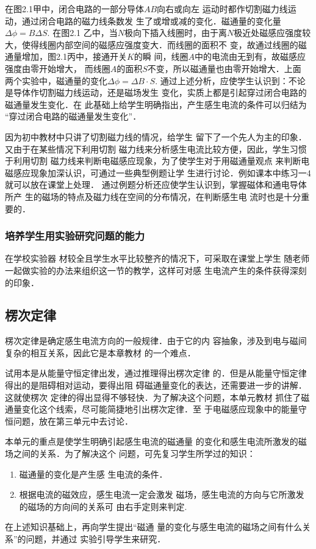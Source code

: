 在图2.1甲中，闭合电路的一部分导体$AB$向右或向左
运动时都作切割磁力线运动，通过闭合电路的磁力线条数发
生了或增或减的变化．磁通量的变化量$\Delta\phi=B\Delta S$. 在图2.1
乙中，当$N$极向下插入线圈时，由于离$N$极近处磁感应强度较
大，使得线圈内部空间的磁感应强度变大．而线圈的面积不
变，故通过线圈的磁通量增加，图2.1丙中，接通开关$K$的瞬
间，线圈$A$中的电流由无到有，故磁感应强度由零开始增大，
而线圈$A$的面积$S$不变，所以磁通量也由零开始增大．上面
两个实验中，磁通量的变化$\Delta\phi=\Delta B\cdot S$. 通过上述分析，应使学生认识到：不论是导体作切割磁力线运动，还是磁场发生
变化，实质上都是引起穿过闭合电路的磁通量发生变化．在
此基础上给学生明确指出，产生感生电流的条件可以归结为
“穿过闭合电路的磁通量发生变化”．

因为初中教材中只讲了切割磁力线的情况，给学生
留下了一个先人为主的印象．又由于在某些情况下利用切割
磁力线来分析感生电流比较方便，因此，学生习惯于利用切割
磁力线来判断电磁感应现象，为了使学生对于用磁通量观点
来判断电磁感应现象加深认识，可通过一些典型例题让学
生进行讨论．例如课本中练习一4就可以放在课堂上处理．
通过例题分析还应使学生认识到，掌握磁体和通电导体所产
生的磁场的特点及磁力线在空间的分布情况，在判断感生电
流时也是十分重要的．


\subsubsection{培养学生用实验研究问题的能力}

在学校实验器
材较全且学生水平比较整齐的情况下，可采取在课堂上学生
随老师一起做实验的办法来组织这一节的教学，这样可对感
生电流产生的条件获得深刻的印象．

\subsection{楞次定律}
楞次定律是确定感生电流方向的一般规律．由于它的内
容抽象，涉及到电与磁间复杂的相互关系，因此它是本章教材
的一个难点．

试用本是从能量守恒定律出发，通过推理得出楞次定律
的．但是从能量守恒定律得出的是阻碍相对运动，要得出阻
碍磁通量变化的表达，还需要进一步的讲解．这就使楞次
定律的得出显得不够轻快．为了解决这个问题，本单元教材
抓住了磁通量变化这个线索，尽可能简捷地引出楞次定律．至
于电磁感应现象中的能量守恒问题，放在第三单元中去讨论．

本单元的重点是使学生明确引起感生电流的磁通量
的变化和感生电流所激发的磁场之间的关系．为了解决这个
问题，可先复习学生所学过的知识：
\begin{enumerate}
\item 磁通量的变化是产生感
生电流的条件．  
  \item 根据电流的磁效应，感生电流一定会激发
磁场，感生电流的方向与它所激发的磁场的方向间的关系可
由右手定则来判定.
\end{enumerate}
在上述知识基础上，再向学生提出“磁通
量的变化与感生电流的磁场之间有什么关系”的问题，并通过
实验引导学生来研究．

